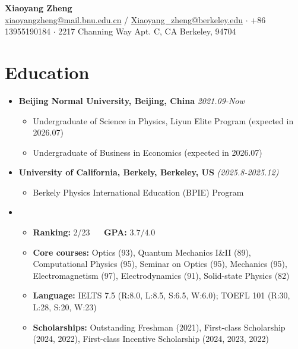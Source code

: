 \documentclass[10pt, a4paper]{article}
\begin{document}
\begin{center}
    \textbf{\LARGE Xiaoyang Zheng}\\[0.3em]
    \small
    \href{mailto:xiaoyangzheng@mail.bnu.edu.cn}{xiaoyangzheng@mail.bnu.edu.cn} / \href{mailto:Xiaoyang_zheng@berkeley.edu}{Xiaoyang\_zheng@berkeley.edu} $\cdot$
    +86 13955190184 $\cdot$
    2217 Channing Way Apt. C, CA Berkeley, 94704
\end{center}
\vspace{-0.2em}


\section{Education}

\begin{itemize}[leftmargin=*, label={}]

    \item
    \textbf{Beijing Normal University, Beijing, China} \hfill \textit{2021.09-Now}
    \begin{itemize}
        \item Undergraduate of Science in Physics, Liyun Elite Program \hfill (expected in 2026.07)
        \item Undergraduate of Business in Economics \hfill (expected in 2026.07)
    \end{itemize}

    \item
    \textbf{University of California, Berkely, Berkeley, US} \hfill \textit{(2025.8-2025.12)}
    \begin{itemize}
        \item Berkely Physics International Education (BPIE) Program
    \end{itemize}

    \item
    \begin{itemize}[leftmargin=1.5em]
        \item \textbf{Ranking:} 2/23 $\quad$ \textbf{GPA:} $3.7/4.0$
        \item \textbf{Core courses:} Optics (93), Quantum Mechanics I\&II (89), Computational Physics (95), Seminar on Optics (95), Mechanics (95), Electromagnetism (97), Electrodynamics (91), Solid-state Physics (82)
        \item \textbf{Language:} IELTS 7.5 (R:8.0, L:8.5, S:6.5, W:6.0); TOEFL 101 (R:30, L:28, S:20, W:23)
        \item \textbf{Scholarships:} Outstanding Freshman (2021), First-class Scholarship (2024, 2022), First-class Incentive Scholarship (2024, 2023, 2022)
    \end{itemize}
    
\end{itemize}
\end{document}
